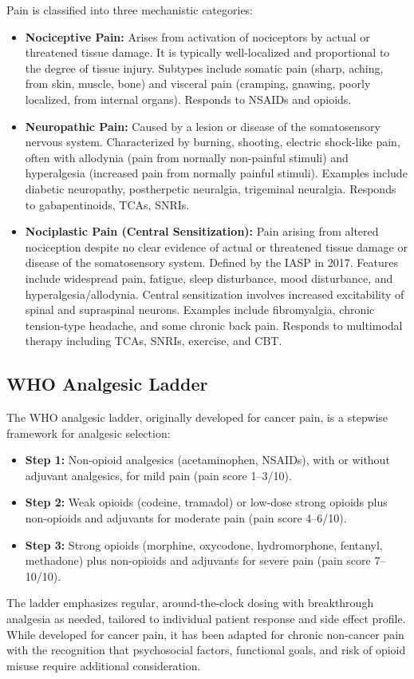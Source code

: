 Pain is classified into three mechanistic categories:
\begin{itemize}[noitemsep]
  \item \textbf{Nociceptive Pain:} Arises from activation of nociceptors by actual or threatened tissue damage. It is typically well-localized and proportional to the degree of tissue injury. Subtypes include somatic pain (sharp, aching, from skin, muscle, bone) and visceral pain (cramping, gnawing, poorly localized, from internal organs). Responds to NSAIDs and opioids.
  \item \textbf{Neuropathic Pain:} Caused by a lesion or disease of the somatosensory nervous system. Characterized by burning, shooting, electric shock-like pain, often with allodynia (pain from normally non-painful stimuli) and hyperalgesia (increased pain from normally painful stimuli). Examples include diabetic neuropathy, postherpetic neuralgia, trigeminal neuralgia. Responds to gabapentinoids, TCAs, SNRIs.
  \item \textbf{Nociplastic Pain (Central Sensitization):} Pain arising from altered nociception despite no clear evidence of actual or threatened tissue damage or disease of the somatosensory system. Defined by the IASP in 2017. Features include widespread pain, fatigue, sleep disturbance, mood disturbance, and hyperalgesia/allodynia. Central sensitization involves increased excitability of spinal and supraspinal neurons. Examples include fibromyalgia, chronic tension-type headache, and some chronic back pain. Responds to multimodal therapy including TCAs, SNRIs, exercise, and CBT.
\end{itemize}

\subsection{WHO Analgesic Ladder}
\label{sec:WHO Analgesic Ladder}

The WHO analgesic ladder, originally developed for cancer pain, is a stepwise framework for analgesic selection:
\begin{itemize}[noitemsep]
  \item \textbf{Step 1:} Non-opioid analgesics (acetaminophen, NSAIDs), with or without adjuvant analgesics, for mild pain (pain score 1--3/10).
  \item \textbf{Step 2:} Weak opioids (codeine, tramadol) or low-dose strong opioids plus non-opioids and adjuvants for moderate pain (pain score 4--6/10).
  \item \textbf{Step 3:} Strong opioids (morphine, oxycodone, hydromorphone, fentanyl, methadone) plus non-opioids and adjuvants for severe pain (pain score 7--10/10).
\end{itemize}
The ladder emphasizes regular, around-the-clock dosing with breakthrough analgesia as needed, tailored to individual patient response and side effect profile. While developed for cancer pain, it has been adapted for chronic non-cancer pain with the recognition that psychosocial factors, functional goals, and risk of opioid misuse require additional consideration.

